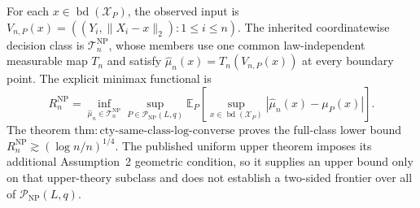 For each \(x\in\operatorname{bd}(\mathcal X_P)\), the observed input is \(V_{n,P}(x)=((Y_i,\lVert X_i-x\rVert_2):1\leq i\leq n)\).  The inherited coordinatewise decision class is \(\mathcal T_n^{\mathrm{NP}}\), whose members use one common law-independent measurable map \(T_n\) and satisfy \(\widehat\mu_n(x)=T_n(V_{n,P}(x))\) at every boundary point.  The explicit minimax functional is
\[
 R_n^{\mathrm{NP}}
 =\inf_{\widehat\mu_n\in\mathcal T_n^{\mathrm{NP}}}
 \sup_{P\in\mathcal P_{\mathrm{NP}}(L,q)}
 \mathbb E_P\!\left[
 \sup_{x\in\operatorname{bd}(\mathcal X_P)}
 |\widehat\mu_n(x)-\mu_P(x)|
 \right].
\]
The theorem \(\mathrm{thm:cty\text{-}same\text{-}class\text{-}log\text{-}converse}\) proves the full-class lower bound \(R_n^{\mathrm{NP}}\gtrsim(\log n/n)^{1/4}\).  The published uniform upper theorem imposes its additional Assumption~2 geometric condition, so it supplies an upper bound only on that upper-theory subclass and does not establish a two-sided frontier over all of \(\mathcal P_{\mathrm{NP}}(L,q)\).